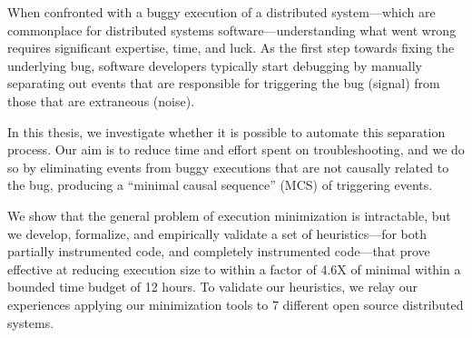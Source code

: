 
%

When confronted with a buggy execution of a distributed system---which are
commonplace for distributed
systems software---understanding what went wrong requires significant expertise, time, and luck.
As the first step towards fixing the underlying bug, software developers typically
start debugging by manually separating out events that are responsible for triggering the bug (signal) from those that are extraneous (noise).

In this thesis, we investigate whether it is possible to automate this
separation process. Our aim is to reduce time and effort spent on
troubleshooting, and we do so by eliminating
events from buggy executions that are not causally related to the bug, producing a ``minimal
causal sequence'' (MCS) of triggering events.

We show that the general problem of execution
minimization is intractable, but we develop, formalize, and
empirically validate a set of heuristics---for both partially instrumented code, and completely instrumented code---that prove effective at
reducing execution size to within a factor of 4.6X of minimal within a bounded
time budget of 12 hours.
To validate our heuristics, we relay our experiences applying our minimization
tools to 7 different open source distributed systems.

